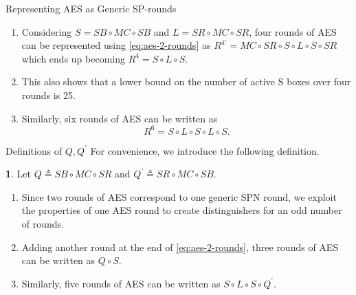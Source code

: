 \documentclass[notheorems]{beamer}
\theoremstyle{definition}
\newtheorem{definition}{\translate{Definition}}
\theoremstyle{example}
\begin{document}
    \begin{frame}{Representing AES as Generic SP-rounds}
        \begin{enumerate}
            \item<1-> Considering \(S = SB \circ MC \circ SB\) and \(L = SR
            \circ MC \circ SR\), four rounds of AES can be represented using
            \eqref{eq:aes-2-rounds} as \(R^{4\prime} = MC \circ SR \circ S \circ
            L \circ S \circ SR\) which ends up becoming \(R^4 = S \circ L \circ
            S\).
            \item<2-> This also shows that a lower bound on the number of active
            S boxes over four rounds is 25.
            \item<4-> Similarly, six rounds of AES can be written as
            \begin{equation}
                R^6 = S \circ L \circ S \circ L \circ S.
            \end{equation}
        \end{enumerate}
    \end{frame}

    \begin{frame}{Definitions of \(Q, Q^\prime\)}
        For convenience, we introduce the following definition.
        \begin{definition}
            \label{def:q}
            Let \(Q \triangleq SB \circ MC \circ SR\) and \(Q^\prime \triangleq
            SR \circ MC \circ SB\).
        \end{definition}
        \begin{enumerate}
            \item<2-> Since two rounds of AES correspond to one generic SPN
            round, we exploit the properties of one AES round to create
            distinguishers for an odd number of rounds. 
            \item<3-> Adding another round at the end of
            \eqref{eq:aes-2-rounds}, three rounds of AES can be written as \(Q
            \circ S\).
            \item<4-> Similarly, five rounds of AES can be written as \(S \circ
            L \circ S \circ Q^\prime\).
        \end{enumerate}
    \end{frame}
\end{document}
